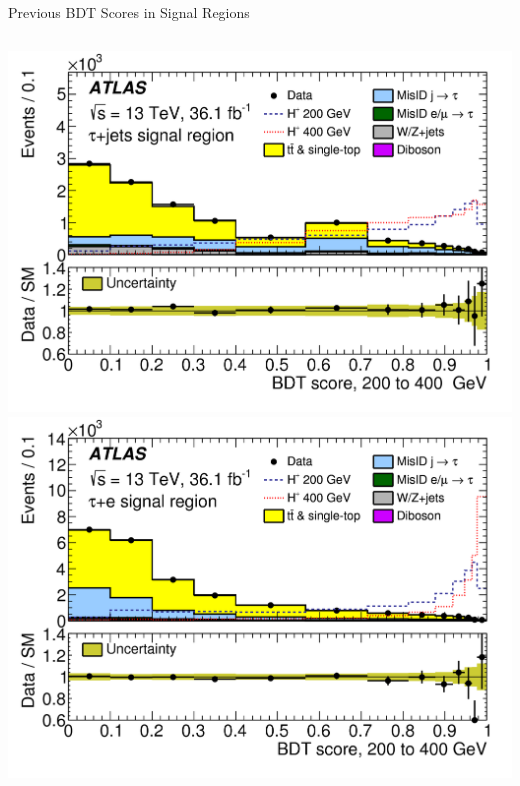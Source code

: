 \documentclass[aspectratio=169,xcolor=table]{beamer}
\begin{document}
\begin{frame}[t]{Previous BDT Scores in Signal Regions}
\begin{columns}[t]
          \includegraphics[height=.4\textheight,keepaspectratio=true]{taujet_SR_2018/taujet_SR_200to400_2018.png}
          \includegraphics[height=.4\textheight,keepaspectratio=true]{tauel_SR_2018/tauel_SR_200to400_2018.png}


        \end{columns}
      \end{frame}
\end{document}
